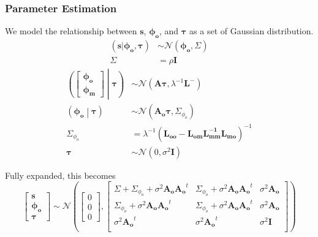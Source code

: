 \subsubsection{Parameter Estimation}
    We model the relationship between $\mathbf{s}$, $\mathbf{\phi_o}$, and
    $\mathbf{\tau}$ as a set of Gaussian distribution.
    \begin{align}
        \left(\mathbf{s}|\mathbf{\phi_o}, \mathbf{\tau}\right) &\sim
            \mathcal{N}(\mathbf{\phi_o}, \Sigma)\\
        \Sigma &= \rho\mathbf{I}
    \end{align}
    \begin{align}
        \left(\begin{bmatrix}
            \mathbf{\phi_o}\\
            \mathbf{\phi_m}
        \end{bmatrix}\middle|\mathbf{\tau}\right) &\sim
            \mathcal{N}(\mathbf{A\tau}, \lambda^{-1}\mathbf{L}^-)\\
        \left(\mathbf{\phi_o}\middle|\mathbf{\tau}\right) &\sim
            \mathcal{N}\left(\mathbf{A_o}\mathbf{\tau}, \Sigma_{\phi_o}\right)\\
        \Sigma_{\phi_o} &= \lambda^{-1}\left(
            \mathbf{L_{oo}} - \mathbf{L_{om}L_{mm}^{-1}L_{mo}}\right)^{-1}\\
        \mathbf{\tau} &\sim \mathcal{N}\left(0, \sigma^2\mathbf{I}\right)
    \end{align}

    \noindent Fully expanded, this becomes
    \begin{equation}
        \begin{bmatrix}
            \mathbf{s}\\
            \mathbf{\phi_o}\\
            \mathbf{\tau}
        \end{bmatrix} \sim \mathcal{N}\left(
            \begin{bmatrix}0\\0\\0\end{bmatrix},
            \begin{bmatrix}
                \Sigma + \Sigma_{\phi_o} + \sigma^2\mathbf{A_oA_o}^t &
                \Sigma_{\phi_o} + \sigma^2\mathbf{A_oA_o}^t &
                \sigma^2\mathbf{A_o}\\
                \Sigma_{\phi_o} + \sigma^2\mathbf{A_oA_o}^t &
                \Sigma_{\phi_o} + \sigma^2\mathbf{A_oA_o}^t &
                \sigma^2\mathbf{A_o}\\
                \sigma^2\mathbf{A_o}^t & \sigma^2\mathbf{A_o}^t & \sigma^2\mathbf{I}\\
            \end{bmatrix}
        \right)\label{eqn:multivariate_gaussian_model}
    \end{equation}

